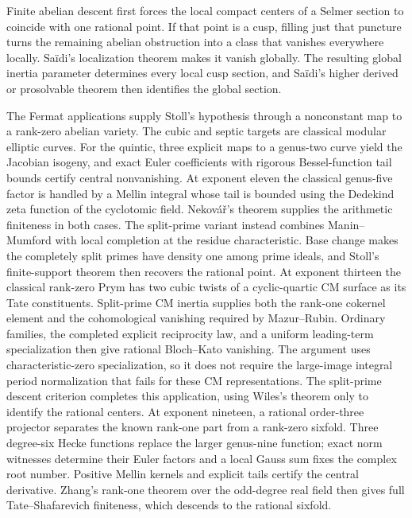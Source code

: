 \documentclass[11pt]{article}
\numberwithin{equation}{section}
\theoremstyle{definition}
\begin{document}
Finite abelian descent first forces the local compact centers of a
Selmer section to coincide with one rational point. If that point is a
cusp, filling just that puncture turns the remaining abelian obstruction
into a class that vanishes everywhere locally. Sa\"idi's localization
theorem makes it vanish globally. The resulting global inertia
parameter determines every local cusp section, and Sa\"idi's higher
derived or prosolvable theorem then identifies the global section.

The Fermat applications supply Stoll's hypothesis through a nonconstant
map to a rank-zero abelian variety. The cubic and septic targets are
classical modular elliptic curves. For the quintic, three explicit
maps to a genus-two curve yield the Jacobian isogeny, and exact Euler
coefficients with rigorous Bessel-function tail bounds certify central
nonvanishing. At exponent eleven the classical genus-five factor is
handled by a Mellin integral whose tail is bounded using the
Dedekind zeta function of the cyclotomic field.
Nekov\'a\v r's theorem supplies the arithmetic finiteness in both cases.
The split-prime variant instead combines Manin--Mumford with local
completion at the residue characteristic. Base change makes the
completely split primes have density one among prime ideals, and
Stoll's finite-support theorem then recovers the rational point.
At exponent thirteen the classical rank-zero Prym has two cubic twists
of a cyclic-quartic CM surface as its Tate constituents. Split-prime
CM inertia supplies both the rank-one cokernel element and the
cohomological vanishing required by Mazur--Rubin. Ordinary families,
the completed explicit reciprocity law, and a uniform leading-term
specialization then give rational Bloch--Kato vanishing. The argument
uses characteristic-zero specialization, so it does not require the
large-image integral period normalization that fails for these CM
representations. The split-prime descent criterion completes this
application, using Wiles's theorem only to identify the rational centers.
At exponent nineteen, a rational order-three projector separates the
known rank-one part from a rank-zero sixfold. Three degree-six
Hecke functions replace the larger genus-nine function; exact norm
witnesses determine their Euler factors and a local Gauss sum fixes
the complex root number. Positive Mellin kernels and explicit tails
certify the central derivative. Zhang's rank-one theorem over the
odd-degree real field then gives full Tate--Shafarevich finiteness,
which descends to the rational sixfold.
\end{document}

